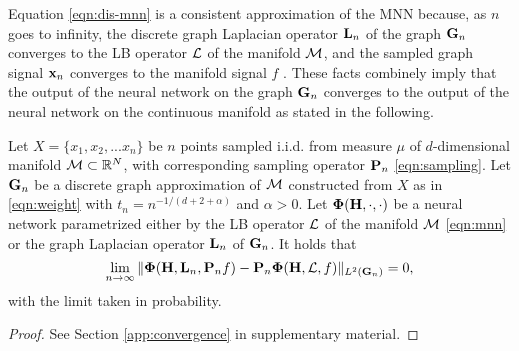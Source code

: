 Equation \eqref{eqn:dis-mnn} is a consistent approximation of the MNN because, as $n$ goes to infinity, the discrete graph Laplacian operator ${\mathbf L}_n$ of the graph ${\mathbf G}_n$ converges to the LB operator ${\mathcal L}$ of the manifold ${\mathcal M}$, and the sampled graph signal ${\mathbf x}_n$ converges to the manifold signal $f$ \cite{belkin2008towards}. These facts combinely imply that the output of the neural network on the graph ${\mathbf G}_n$ converges to the output of the neural network on the continuous manifold as stated in the following.
\begin{proposition}
\label{prop:convergence} 
Let $X=\{x_1, x_2,...x_n\}$ be $n$ points sampled i.i.d. from measure $\mu$ of $d$-dimensional manifold ${\mathcal M} \subset {\mathbb R}^N$, with corresponding sampling operator ${\mathbf P}_n$ \eqref{eqn:sampling}. Let ${\mathbf G}_n$ be a discrete graph approximation of ${\mathcal M}$ constructed from $X$ as in \eqref{eqn:weight} with $t_n = n^{-1/(d+2+\alpha)}$ and $\alpha>0$. Let $\bm\Phi({\mathbf H}, \cdot, \cdot)$ be a neural network parametrized either by the LB
operator ${\mathcal L}$ of the manifold ${\mathcal M}$ \eqref{eqn:mnn} or the graph Laplacian operator ${\mathbf L}_n$ of ${\mathbf G}_n$. It holds that
\begin{equation}
    \lim_{n\rightarrow \infty} \|\bm\Phi({\mathbf H},{\mathbf L}_n,{\mathbf P}_n f) - {\mathbf P}_n \bm\Phi({\mathbf H},{\mathcal L},f) \|_{L^2({\mathbf G}_n)} = 0,
\end{equation}
with the limit taken in probability.
\end{proposition}
\begin{proof}
See Section \ref{app:convergence} in supplementary material.
\end{proof}


